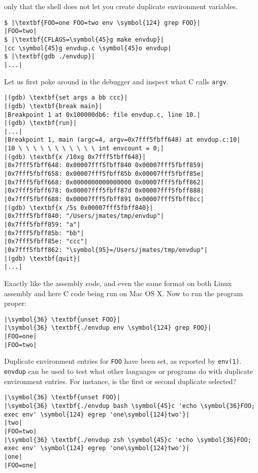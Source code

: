 \documentclass[10pt,a4paper]{article}
\begin{document}
only that the shell does not let you create duplicate environment
variables.

\begin{lstlisting}
$ |\textbf{FOO=one FOO=two env \symbol{124} grep FOO}|
|FOO=two|
$ |\textbf{CFLAGS=\symbol{45}g make envdup}|
|cc \symbol{45}g envdup.c \symbol{45}o envdup|
$ |\textbf{gdb ./envdup}|
|...|
\end{lstlisting}

Let us first poke around in the debugger and inspect what C calls
\texttt{argv}.

\begin{lstlisting}
|(gdb) \textbf{set args a bb ccc}|
|(gdb) \textbf{break main}|
|Breakpoint 1 at 0x100000db6: file envdup.c, line 10.|
|(gdb) \textbf{run}|
|...|
|Breakpoint 1, main (argc=4, argv=0x7fff5fbff648) at envdup.c:10|
|10 \ \ \ \ \ \ \ \ \ \ \ int envcount = 0;|
|(gdb) \textbf{x /10xg 0x7fff5fbff648}|
|0x7fff5fbff648: 0x00007fff5fbff840 0x00007fff5fbff859|
|0x7fff5fbff658: 0x00007fff5fbff85b 0x00007fff5fbff85e|
|0x7fff5fbff668: 0x0000000000000000 0x00007fff5fbff862|
|0x7fff5fbff678: 0x00007fff5fbff87d 0x00007fff5fbff888|
|0x7fff5fbff688: 0x00007fff5fbff891 0x00007fff5fbff8cc|
|(gdb) \textbf{x /5s 0x00007fff5fbff840}|
|0x7fff5fbff840: "/Users/jmates/tmp/envdup"|
|0x7fff5fbff859: "a"|
|0x7fff5fbff85b: "bb"|
|0x7fff5fbff85e: "ccc"|
|0x7fff5fbff862: "\symbol{95}=/Users/jmates/tmp/envdup"|
|(gdb) \textbf{quit}|
|...|
\end{lstlisting}

Exactly like the assembly code, and even the same format on both
Linux assembly and here C code being run on Mac OS X. Now to run the
program proper:

\begin{lstlisting}
|\symbol{36} \textbf{unset FOO}|
|\symbol{36} \textbf{./envdup env \symbol{124} grep FOO}|
|FOO=one|
|FOO=two|
\end{lstlisting}

Duplicate environment entries for \texttt{FOO} have been set, as
reported by \texttt{env(1)}. \texttt{envdup} can be used to test what
other languages or programs do with duplicate environment entries. For
instance, is the first or second duplicate selected?

\begin{lstlisting}
|\symbol{36} \textbf{unset FOO}|
|\symbol{36} \textbf{./envdup bash \symbol{45}c 'echo \symbol{36}FOO; exec env' \symbol{124} egrep 'one\symbol{124}two'}|
|two|
|FOO=two|
|\symbol{36} \textbf{./envdup zsh \symbol{45}c 'echo \symbol{36}FOO; exec env' \symbol{124} egrep 'one\symbol{124}two'}|
|one|
|FOO=one|
\end{lstlisting}
\end{document}
